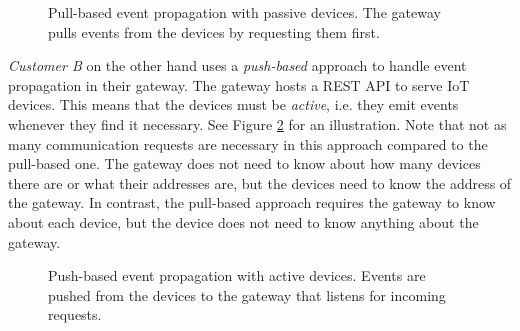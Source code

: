 \begin{figure}[h!]
    \centering
    \caption[Pull-based event propagation]{Pull-based event propagation with
    passive devices. The gateway pulls events from the devices by requesting
    them first.}
    \label{fig:pull-based}
\end{figure}

\textit{Customer B} on the other hand uses a \textit{push-based} approach to
handle event propagation in their gateway. The gateway hosts a REST API to
serve IoT devices. This means that the devices must be \textit{active}, i.e.
they emit events whenever they find it necessary. See Figure
\ref{fig:push-based} for an illustration. Note that not as many communication
requests are necessary in this approach compared to the pull-based one. The
gateway does not need to know about how many devices there are or what their
addresses are, but the devices need to know the address of the gateway. In
contrast, the pull-based approach requires the gateway to know about each
device, but the device does not need to know anything about the gateway.

\begin{figure}[h!]
    \centering
    \caption[Push-based event propagation]{Push-based event propagation with
    active devices. Events are pushed from the devices to the gateway that
    listens for incoming requests.}
    \label{fig:push-based}
\end{figure}

